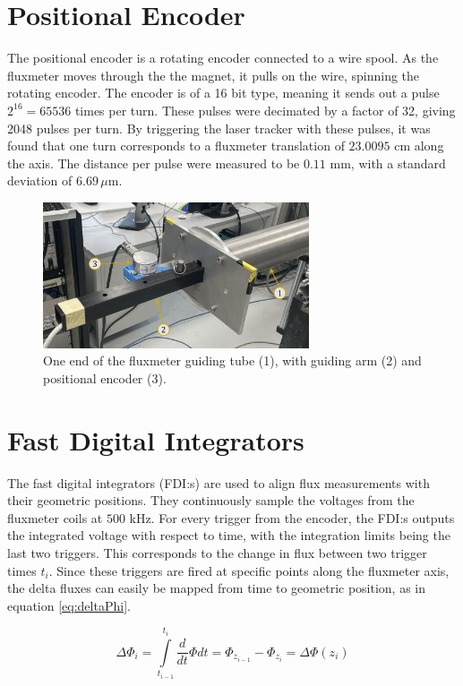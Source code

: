 \section{Positional Encoder}
The positional encoder is a rotating encoder connected to a wire spool.
As the fluxmeter moves through the the magnet, it pulls on the wire,
spinning the rotating encoder. The encoder is of a 16 bit type, meaning
it sends out a pulse $2^{16} = 65536$ times per turn. These pulses were
decimated by a factor of 32, giving 2048 pulses per turn. By triggering
the laser tracker with these pulses, it was found that one turn corresponds
to a fluxmeter translation of $23.0095$ cm along the axis. The distance
per pulse were measured to be $0.11$ mm, with a standard deviation of
$6.69 \, \mu \text{m}$.

\begin{figure}[h]
    \centering
    \includegraphics[width=0.7\textwidth]{figs/encoder}
    \caption{One end of the fluxmeter guiding tube (1), with guiding arm (2)
        and positional encoder (3).}
    \label{fig:encoderpic}
\end{figure}

\section{Fast Digital Integrators}
The fast digital integrators (FDI:s) are used to align flux measurements
with their geometric positions. They continuously sample the voltages
from the fluxmeter coils at $500$ kHz. For every trigger from the encoder,
the FDI:s outputs the integrated voltage with respect to time, with the
integration limits being the last two triggers. This
corresponds to the change in flux between two trigger times $t_i$. Since these
triggers are fired at specific points along the fluxmeter axis, the
delta fluxes can easily be mapped from time to geometric position, as in
equation \ref{eq:deltaPhi}.

\begin{equation}
    \Delta \Phi_i =
    \int \limits_{t_{i-1}}^{t_i} \frac{d}{dt}\Phi dt
    = \Phi_{z_{i-1}} - \Phi_{z_{i}} = \Delta \Phi(z_i)
    \label{eq:deltaPhi}
\end{equation}

